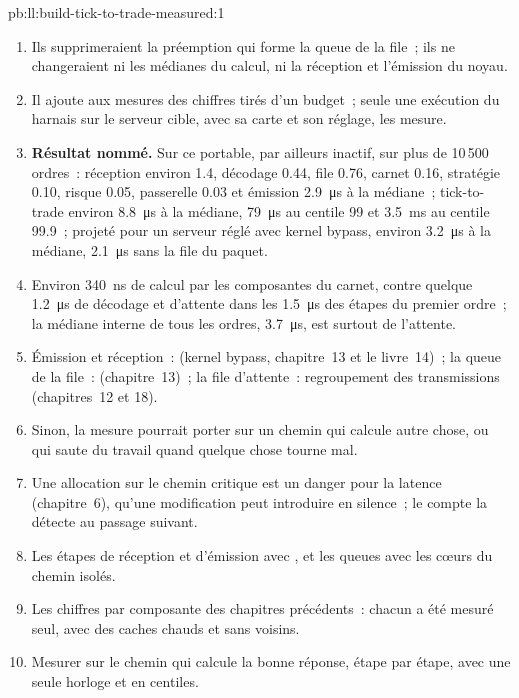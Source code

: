\begin{solution}{pb:ll:build-tick-to-trade-measured:1}
\begin{enumerate}
\item Ils supprimeraient la préemption qui forme la queue de la file~; ils ne changeraient ni les médianes du calcul, ni la
réception et l'émission du noyau.
\item Il ajoute aux mesures des chiffres tirés d'un budget~; seule une exécution du harnais sur le serveur cible, avec sa carte et son
réglage, les mesure.
\item \textbf{Résultat nommé.} Sur ce portable, par ailleurs inactif, sur plus de 10\,500 ordres~: réception environ 1.4, décodage 0.44, file 0.76, carnet
0.16, stratégie 0.10, risque 0.05, passerelle 0.03 et émission \qty{2.9}{\micro\second} à la médiane~; tick-to-trade environ
\qty{8.8}{\micro\second} à la médiane, \qty{79}{\micro\second} au centile 99 et \qty{3.5}{\milli\second} au centile 99.9~;
projeté pour un serveur réglé avec kernel bypass, environ \qty{3.2}{\micro\second} à la médiane, \qty{2.1}{\micro\second} sans
la file du paquet.
\item Environ \qty{340}{\nano\second} de calcul par les composantes du carnet, contre quelque \qty{1.2}{\micro\second} de décodage et
d'attente dans les \qty{1.5}{\micro\second} des étapes du premier ordre~; la médiane interne de tous les ordres, \qty{3.7}{\micro\second}, est
surtout de l'attente.
\item Émission et réception~:  (kernel bypass, chapitre~13 et le livre~14)~; la queue de la file~:  (chapitre~13)~; la
file d'attente~: regroupement des transmissions (chapitres~12 et 18).
\item Sinon, la mesure pourrait porter sur un chemin qui calcule autre chose, ou qui saute du travail quand quelque chose tourne mal.
\item Une allocation sur le chemin critique est un danger pour la latence (chapitre~6), qu'une modification peut introduire en silence~; le compte
la détecte au passage suivant.
\item Les étapes de réception et d'émission avec , et les queues avec les cœurs du chemin isolés.
\item Les chiffres par composante des chapitres précédents~: chacun a été mesuré seul, avec des caches chauds et sans voisins.
\item Mesurer sur le chemin qui calcule la bonne réponse, étape par étape, avec une seule horloge et en centiles.
\end{enumerate}
\end{solution}

